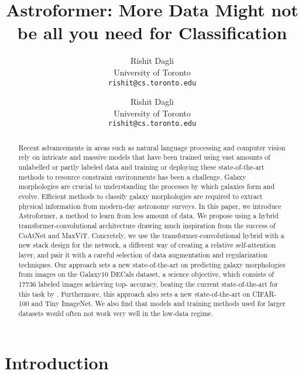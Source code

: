 \documentclass{article} \usepackage{iclr2023_conference,times}
\title{Astroformer: More Data Might not be all you need for Classification}
\author{Rishit Dagli \\
University of Toronto\\
\texttt{rishit@cs.toronto.edu}
}
\author{
Rishit Dagli\\
University of Toronto\\
\texttt{rishit@cs.toronto.edu}
}
\begin{document}
\maketitle

\begin{abstract}
Recent advancements in areas such as natural language processing and computer vision rely on intricate and massive models that have been trained using vast amounts of unlabelled or partly labeled data and training or deploying these state-of-the-art methods to resource constraint environments has been a challenge. Galaxy morphologies are crucial to understanding the processes by which galaxies form and evolve. Efficient methods to classify galaxy morphologies are required to extract physical information from modern-day astronomy surveys. In this paper, we introduce Astroformer, a method to learn from less amount of data. We propose using a hybrid transformer-convolutional architecture drawing much inspiration from the success of CoAtNet and MaxViT. Concretely, we use the transformer-convolutional hybrid with a new stack design for the network, a different way of creating a relative self-attention layer, and pair it with a careful selection of data augmentation and regularization techniques. Our approach sets a new state-of-the-art on predicting galaxy morphologies from images on the Galaxy10 DECals dataset, a science objective, which consists of 17736 labeled images achieving  top- accuracy, beating the current state-of-the-art for this task by . Furthermore, this approach also sets a new state-of-the-art on CIFAR-100 and Tiny ImageNet. We also find that models and training methods used for larger datasets would often not work very well in the low-data regime.
\end{abstract}

\section{Introduction}
\label{introduction}
\end{document}
